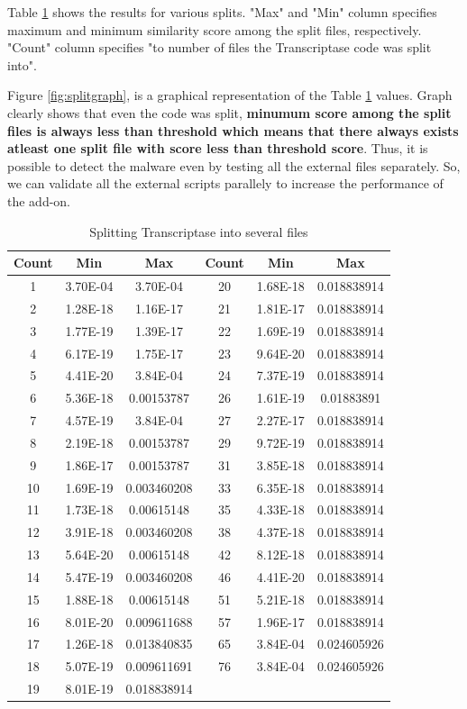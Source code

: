 Table \ref{tab:splitvalues} shows the results for various splits. "Max" and "Min" column specifies maximum and minimum similarity score among the split files, respectively. "Count" column specifies "to number of files the Transcriptase code was split into".

Figure \ref{fig:splitgraph}, is a graphical representation of the Table \ref{tab:splitvalues} values. Graph clearly shows that even the code was split, \textbf{minumum score among the split files is always less than threshold which means that there always exists atleast one split file with score less than threshold score}. Thus, it is possible to detect the malware even by testing all the external files separately. So, we can validate all the external scripts parallely to increase the performance of the add-on.


\begin {table}[h]
\caption {Splitting Transcriptase into several files} \label{tab:splitvalues} 
  \begin{tabular}{|c|c|c|c|c|c|}  
  \midrule
 Count&Min&Max&Count&Min&Max\\
\midrule
1&3.70E-04&3.70E-04&20&1.68E-18&0.018838914\\
\midrule
2&1.28E-18&1.16E-17&21&1.81E-17&0.018838914\\
\midrule
3&1.77E-19&1.39E-17&22&1.69E-19&0.018838914\\
\midrule
4&6.17E-19&1.75E-17&23&9.64E-20&0.018838914\\
\midrule
5&4.41E-20&3.84E-04&24&7.37E-19&0.018838914\\
\midrule
6&5.36E-18&0.00153787&26&1.61E-19&0.01883891\\
\midrule
7&4.57E-19&3.84E-04&27&2.27E-17&0.018838914\\
\midrule
8&2.19E-18&0.00153787&29&9.72E-19&0.018838914\\
\midrule
9&1.86E-17&0.00153787&31&3.85E-18&0.018838914\\
\midrule
10&1.69E-19&0.003460208&33&6.35E-18&0.018838914\\
\midrule
11&1.73E-18&0.00615148&35&4.33E-18&0.018838914\\
\midrule
12&3.91E-18&0.003460208&38&4.37E-18&0.018838914\\
\midrule
13&5.64E-20&0.00615148&42&8.12E-18&0.018838914\\
\midrule
14&5.47E-19&0.003460208&46&4.41E-20&0.018838914\\
\midrule
15&1.88E-18&0.00615148&51&5.21E-18&0.018838914\\
\midrule
16&8.01E-20&0.009611688&57&1.96E-17&0.018838914\\
\midrule
17&1.26E-18&0.013840835&65&3.84E-04&0.024605926\\
\midrule
18&5.07E-19&0.009611691&76&3.84E-04&0.024605926\\
\midrule
19&8.01E-19&0.018838914\\
\cmidrule{1-3}
\end{tabular}
 \end {table}

